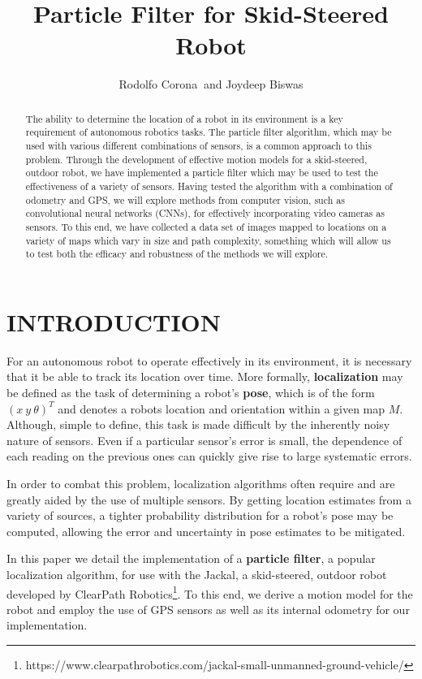 \documentclass[letterpaper, 12 pt, conference]{ieeeconf}  %
\title{\LARGE \bf
Particle Filter for Skid-Steered Robot
}
\author{Rodolfo Corona%
$~$and Joydeep Biswas%
}
\begin{document}
\maketitle
\thispagestyle{empty}
\pagestyle{empty}


\begin{abstract}

The ability to determine the location of a robot in its environment is a key requirement of autonomous robotics tasks. The particle filter algorithm, which may be used with various different combinations of sensors, is a common approach to this problem. Through the development of effective motion models for a skid-steered, outdoor robot, we have implemented a particle filter which may be used to test the effectiveness of a variety of sensors. Having tested the algorithm with a combination of odometry and GPS, we will explore methods from computer vision, such as convolutional neural networks (CNNs), for effectively incorporating video cameras as sensors. To this end, we have collected a data set of images mapped to locations on a variety of maps which vary in size and path complexity, something which will allow us to test both the efficacy and robustness of the methods we will explore.

\end{abstract}


\section{INTRODUCTION}
For an autonomous robot to operate effectively in its environment, it is necessary that it be able to track its location over time. More formally, \textbf{localization} may be defined as the task of determining a robot's \textbf{pose}, which is of the form $(x~y~\theta)^T$ and denotes a robots location and orientation within a given map $M$. Although, simple to define, this task is made difficult by the inherently noisy nature of sensors. Even if a particular sensor's error is small, the dependence of each reading on the previous ones can quickly give rise to large systematic errors.  
\par
In order to combat this problem, localization algorithms often require and are greatly aided by the use of multiple sensors. By getting location estimates from a variety of sources, a tighter probability distribution for a robot's pose may be computed, allowing the error and uncertainty in pose estimates to be mitigated. 
\par
In this paper we detail the implementation of a \textbf{particle filter}, a popular localization algorithm, for use with the Jackal, a skid-steered, outdoor robot developed by ClearPath Robotics\footnote{https://www.clearpathrobotics.com/jackal-small-unmanned-ground-vehicle/}. To this end, we derive a motion model for the robot and employ the use of GPS sensors as well as its internal odometry for our implementation.
\end{document}
